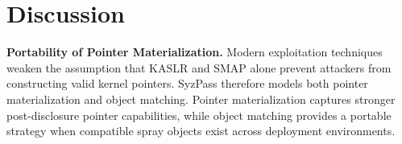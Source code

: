 \section{Discussion}



\noindent\textbf{Portability of Pointer Materialization.} Modern exploitation techniques weaken the assumption that KASLR and SMAP alone prevent attackers from constructing valid kernel pointers. SyzPass therefore models both pointer materialization and object matching. Pointer materialization captures stronger post-disclosure pointer capabilities, while object matching provides a portable strategy when compatible spray objects exist across deployment environments.

